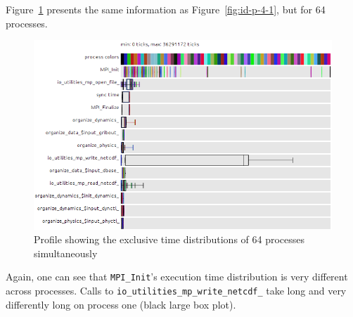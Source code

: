 \documentclass[b5paper, final, hauptseminar]{zih-template}
\begin{document}
Figure~\ref{fig:id-p-64-1} presents the same information as Figure~\ref{fig:id-p-4-1}, but for 64 processes.
\begin{figure}[htbp]
	\centering
	\includegraphics[width=0.8\linewidth]{id-p-64-1}
	\caption{Profile showing the exclusive time distributions of 64 processes simultaneously}
	\label{fig:id-p-64-1}
\end{figure}
Again, one can see that \texttt{MPI\_Init}'s execution time distribution is very different across processes.
Calls to \texttt{io\_utilities\_mp\_write\_netcdf\_} take long and very differently long on process one (black large box plot).
\end{document}
